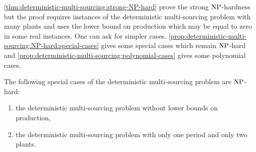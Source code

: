 \cref{thm:deterministic-multi-sourcing:strong-NP-hard} prove the strong $\operatorname{NP}$-hardness but the proof requires instances of the deterministic multi-sourcing problem with many plants and uses the lower bound on production which may be equal to zero in some real instances.
One can ask for simpler cases.
\cref{prop:deterministic-multi-sourcing:NP-hard:special-cases} gives some special cases which remain $\operatorname{NP}$-hard and \cref{prop:deterministic-multi-sourcing:polynomial-cases} gives some polynomial cases.


\begin{prop}\label{prop:deterministic-multi-sourcing:NP-hard:special-cases}
  The following special cases of the deterministic multi-sourcing problem are $\operatorname{NP}$-hard:
  \begin{enumerate}
    \item\label{item:deterministic-multi-sourcing:NP-hard:without-production-lower-bound}
    the deterministic multi-sourcing problem without lower bounds on production,
    \item\label{item:deterministic-multi-sourcing:NP-hard:2-plants}
    the deterministic multi-sourcing problem with only one period and only two plants.
  \end{enumerate}
\end{prop}



